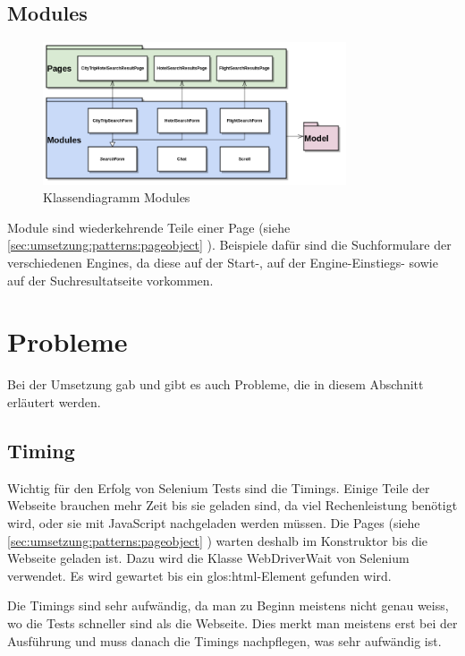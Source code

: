 \subsection{Modules}
\begin{figure}[H]
	\centering
	\includegraphics[width=0.8\textwidth]{images/semesterarbeit class diagram - modules.png}
	\caption{Klassendiagramm Modules}
	\label{fig:umsetzung:architektur:modules}
\end{figure}
Module sind wiederkehrende Teile einer Page (siehe \cref{sec:umsetzung:patterns:pageobject} ). Beispiele dafür sind die Suchformulare der verschiedenen Engines, da diese auf der Start-, auf der Engine-Einstiegs- sowie auf der Suchresultatseite vorkommen.

\section{Probleme}
Bei der Umsetzung gab und gibt es auch Probleme, die in diesem Abschnitt erläutert werden.

\subsection{Timing}
\label{sec:umsetzung:probleme:timing}
Wichtig für den Erfolg von Selenium Tests sind die Timings. Einige Teile der Webseite brauchen mehr Zeit bis sie geladen sind, da viel Rechenleistung benötigt wird, oder sie mit JavaScript nachgeladen werden müssen. Die Pages (siehe \cref{sec:umsetzung:patterns:pageobject} ) warten deshalb im Konstruktor bis die Webseite geladen ist. Dazu wird die Klasse WebDriverWait von Selenium verwendet. Es wird gewartet bis ein \Gls{glos:html}-Element gefunden wird.

Die Timings sind sehr aufwändig, da man zu Beginn meistens nicht genau weiss, wo die Tests schneller sind als die Webseite. Dies merkt man meistens erst bei der Ausführung und muss danach die Timings nachpflegen, was sehr aufwändig ist.

